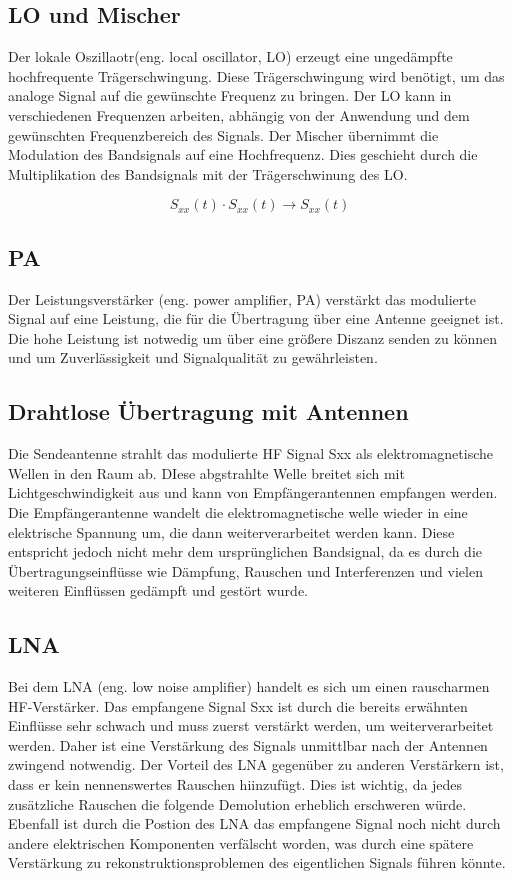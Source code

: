 \subsection{LO und Mischer}
Der lokale Oszillaotr(eng. local oscillator, LO) erzeugt eine ungedämpfte hochfrequente Trägerschwingung. Diese Trägerschwingung 
wird benötigt, um das analoge Signal auf die gewünschte Frequenz zu bringen. Der LO kann in verschiedenen Frequenzen arbeiten,
abhängig von der Anwendung und dem gewünschten Frequenzbereich des Signals. Der Mischer übernimmt die Modulation des
Bandsignals auf eine Hochfrequenz. Dies geschieht durch die Multiplikation des Bandsignals mit der Trägerschwinung des LO.

\begin{equation}
    S_{xx}(t) \cdot S_{xx}(t) \rightarrow S_{xx}(t)
\end{equation}


\subsection{PA}
Der Leistungsverstärker (eng. power amplifier, PA) verstärkt das modulierte Signal auf eine Leistung, die für die Übertragung über eine Antenne 
geeignet ist. Die hohe Leistung ist notwedig um über eine größere Diszanz senden zu können und um Zuverlässigkeit und
Signalqualität zu gewährleisten. 

\subsection{Drahtlose Übertragung mit Antennen}
Die Sendeantenne strahlt das modulierte HF Signal Sxx als elektromagnetische Wellen in den Raum ab. DIese abgstrahlte Welle
breitet sich mit Lichtgeschwindigkeit aus und kann von Empfängerantennen empfangen werden. Die Empfängerantenne wandelt
die elektromagnetische welle wieder in eine elektrische Spannung um, die dann weiterverarbeitet werden kann. Diese entspricht
jedoch nicht mehr dem ursprünglichen Bandsignal, da es durch die Übertragungseinflüsse wie Dämpfung, Rauschen und Interferenzen
und vielen weiteren Einflüssen gedämpft und gestört wurde.

\subsection{LNA}
Bei dem LNA (eng. low noise amplifier) handelt es sich um einen rauscharmen HF-Verstärker. Das empfangene Signal Sxx ist
durch die bereits erwähnten Einflüsse sehr schwach und muss  zuerst verstärkt werden, um weiterverarbeitet werden. Daher
ist eine Verstärkung des Signals unmittlbar nach der Antennen zwingend notwendig. Der Vorteil des LNA gegenüber zu
anderen Verstärkern ist, dass er kein nennenswertes Rauschen hiinzufügt. Dies ist wichtig, da jedes zusätzliche Rauschen
die folgende Demolution erheblich erschweren würde. Ebenfall ist durch die Postion des LNA das empfangene Signal noch 
nicht durch andere elektrischen Komponenten verfälscht worden, was durch eine spätere Verstärkung zu rekonstruktionsproblemen
des eigentlichen Signals führen könnte.
